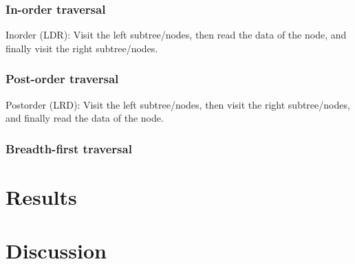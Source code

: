 \documentclass[a4paper, 11pt]{article}
\begin{document}
    \subsubsection*{In-order traversal}
    Inorder (LDR): Visit the left subtree/nodes, then read the data of the node,
    and finally visit the right subtree/nodes.





    \subsubsection*{Post-order traversal}
    Postorder (LRD): Visit the left subtree/nodes, then visit the right
    subtree/nodes, and finally read the data of the node.
    
    

    \subsubsection*{Breadth-first traversal}
    

    \section*{Results}
    \label{sec:results}
    \section*{Discussion}
    \label{sec:discussion}
\end{document}
